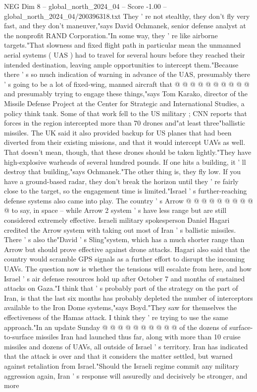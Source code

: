 \begin{textsample}{NEG Dim 8 – global\_north\_2024\_04 – Score -1.00 – global\_north\_2024\_04/200396318.txt}
They ' re not stealthy, they don't fly very fast, and they don't maneuver,"says David Ochmanek, senior defense analyst at the nonprofit RAND Corporation."In some way, they ' re like airborne targets."That slowness and fixed flight path in particular mean the unmanned aerial systems ( UAS ) had to travel for several hours before they reached their intended destination, leaving ample opportunities to intercept them."Because there ' s so much indication of warning in advance of the UAS, presumably there ' s going to be a lot of fixed-wing, manned aircraft that @ @ @ @ @ @ @ @ @ @ and presumably trying to engage these things,"says Tom Karako, director of the Missile Defense Project at the Center for Strategic and International Studies, a policy think tank.
Some of that work fell to the US military ; CNN reports that forces in the region intercepted more than 70 drones and"at least three"ballistic missiles.
The UK said it also provided backup for US planes that had been diverted from their existing missions, and that it would intercept UAVs as well.
That doesn't mean, though, that these drones should be taken lightly."They have high-explosive warheads of several hundred pounds.
If one hits a building, it ' ll destroy that building,"says Ochmanek."The other thing is, they fly low.
If you have a ground-based radar, they don't break the horizon until they ' re fairly close to the target, so the engagement time is limited."Israel ' s further-reaching defense systems also came into play.
The country ' s Arrow @ @ @ @ @ @ @ @ @ @ to say, in space -- while Arrow 2 system ' s have less range but are still considered extremely effective.
Israeli military spokesperson Daniel Hagari credited the Arrow system with taking out most of Iran ' s ballistic missiles.
There ' s also the"David ' s Sling"system, which has a much shorter range than Arrow but should prove effective against drone attacks.
Hagari also said that the country would scramble GPS signals as a further effort to disrupt the incoming UAVs.
The question now is whether the tensions will escalate from here, and how Israel ' s air defense resources hold up after October 7 and months of sustained attacks on Gaza."I think that ' s probably part of the strategy on the part of Iran, is that the last six months has probably depleted the number of interceptors available to the Iron Dome systems,"says Boyd."They saw for themselves the effectiveness of the Hamas attack.
I think they ' re trying to use the same approach."In an update Sunday @ @ @ @ @ @ @ @ @ @ of the dozens of surface-to-surface missiles Iran had launched thus far, along with more than 10 cruise missiles and dozens of UAVs, all outside of Israel ' s territory.
Iran has indicated that the attack is over and that it considers the matter settled, but warned against retaliation from Israel."Should the Israeli regime commit any military aggression again, Iran ' s response will assuredly and decisively be stronger, and more

\end{textsample}
